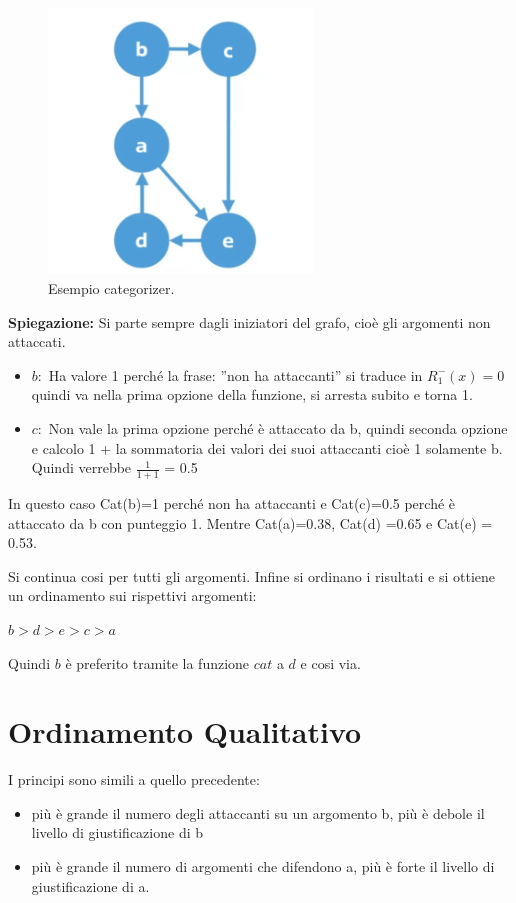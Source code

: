     \begin{figure}[H]
        \centering
        \includegraphics[width=7cm, keepaspectratio]{img/Cap8/quantitativo2.png}
        \caption{Esempio categorizer.}
    \end{figure}
    \noindent \textbf{Spiegazione: } Si parte sempre dagli iniziatori del grafo, cioè gli argomenti non attaccati.
    \begin{itemize}
        \item $b:$ Ha valore 1 perché la frase: ”non ha attaccanti” si traduce in $R^-_1(x) = 0$ quindi va nella prima opzione della funzione, si arresta subito e torna 1.
        \item $c:$ Non vale la prima opzione perché è attaccato da b, quindi seconda opzione e calcolo 1 + la sommatoria dei valori dei suoi attaccanti cioè 1 solamente b. Quindi verrebbe $\frac{1}{1+1}$ = 0.5
    \end{itemize}
    In questo caso Cat(b)=1 perché non ha attaccanti e Cat(c)=0.5 perché è attaccato da b con punteggio 1. Mentre Cat(a)=0.38, Cat(d) =0.65 e Cat(e) = 0.53.

    \vspace{0.3cm}

    Si continua cosi per tutti gli argomenti. Infine si ordinano i risultati e si ottiene un ordinamento sui rispettivi argomenti:
    \begin{center}
        $b>d>e>c>a$
    \end{center}
    Quindi $b$ è preferito tramite la funzione $cat$ a $d$ e cosi via.
    \section{Ordinamento Qualitativo}
    I principi sono simili a quello precedente:
    \begin{itemize}
        \item più è grande il numero degli attaccanti su un argomento b, più è debole il livello di giustificazione di b
        \item più è grande il numero di argomenti che difendono a, più è forte il livello di giustificazione di a.
    \end{itemize}
